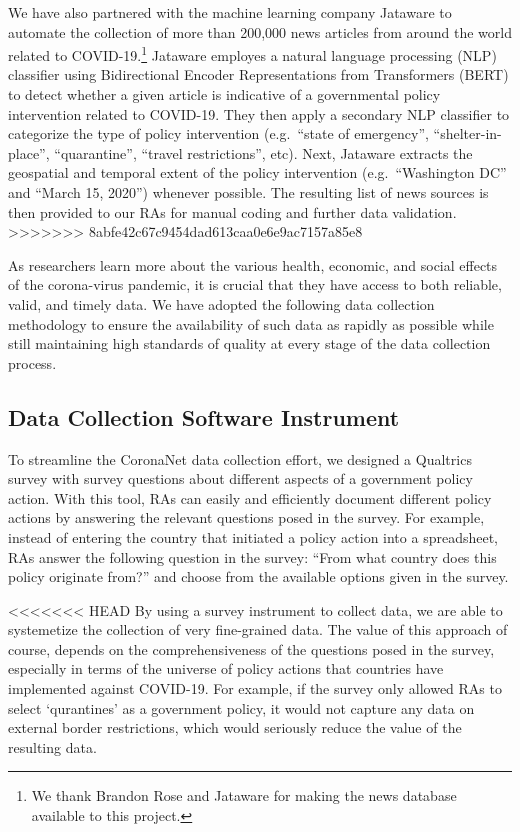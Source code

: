 \documentclass[]{article}
\let\rmarkdownfootnote\footnote%
\def\footnote{\protect\rmarkdownfootnote}
\begin{document}
We have also partnered with the machine learning company Jataware to automate the collection of more than 200,000 news articles from around the world related to COVID-19.\footnote{We thank Brandon Rose and Jataware for making the news database available to this project.} Jataware employes a natural language processing (NLP) classifier using Bidirectional Encoder Representations from Transformers (BERT) to detect whether a given article is indicative of a governmental policy intervention related to COVID-19. They then apply a secondary NLP classifier to categorize the type of policy intervention (e.g.~``state of emergency'', ``shelter-in-place'', ``quarantine'', ``travel restrictions'', etc). Next, Jataware extracts the geospatial and temporal extent of the policy intervention (e.g.~``Washington DC'' and ``March 15, 2020'') whenever possible. The resulting list of news sources is then provided to our RAs for manual coding and further data validation.
>>>>>>> 8abfe42c67c9454dad613caa0e6e9ac7157a85e8

As researchers learn more about the various health, economic, and social effects of the corona-virus pandemic, it is crucial that they have access to both reliable, valid, and timely data. We have adopted the following data collection methodology to ensure the availability of such data as rapidly as possible while still maintaining high standards of quality at every stage of the data collection process.

\hypertarget{data-collection-software-instrument}{%
\subsection{Data Collection Software Instrument}\label{data-collection-software-instrument}}

To streamline the CoronaNet data collection effort, we designed a Qualtrics survey with survey questions about different aspects of a government policy action. With this tool, RAs can easily and efficiently document different policy actions by answering the relevant questions posed in the survey. For example, instead of entering the country that initiated a policy action into a spreadsheet, RAs answer the following question in the survey: ``From what country does this policy originate from?'' and choose from the available options given in the survey.

<<<<<<< HEAD
By using a survey instrument to collect data, we are able to systemetize the collection of very fine-grained data. The value of this approach of course, depends on the comprehensiveness of the questions posed in the survey, especially in terms of the universe of policy actions that countries have implemented against COVID-19. For example, if the survey only allowed RAs to select `qurantines' as a government policy, it would not capture any data on external border restrictions, which would seriously reduce the value of the resulting data.
\end{document}
